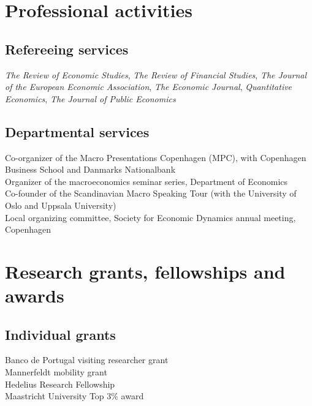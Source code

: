 \documentclass[11pt]{article} %
\begin{document}
\section*{Professional activities}
\subsection*{Refereeing services}
\textit{The Review of Economic Studies}, \textit{The Review of Financial Studies}, \textit{The Journal of the European Economic Association}, \textit{The Economic Journal}, \textit{Quantitative Economics}, \textit{The Journal of Public Economics}

\subsection*{Departmental services}
 Co-organizer of the Macro Presentations Copenhagen (MPC), with Copenhagen Business School and Danmarks Nationalbank\\
 Organizer of the macroeconomics seminar series, Department of Economics\\
 Co-founder of the Scandinavian Macro Speaking Tour (with the University of Oslo and Uppsala University)\\
 Local organizing committee, Society for Economic Dynamics annual meeting, Copenhagen\\
 


\section*{Research grants, fellowships and awards}

\subsection*{Individual grants}
 Banco de Portugal visiting researcher grant \\
 Mannerfeldt mobility grant \\
 Hedelius Research Fellowship \\
 Maastricht University Top 3\% award
\end{document}
